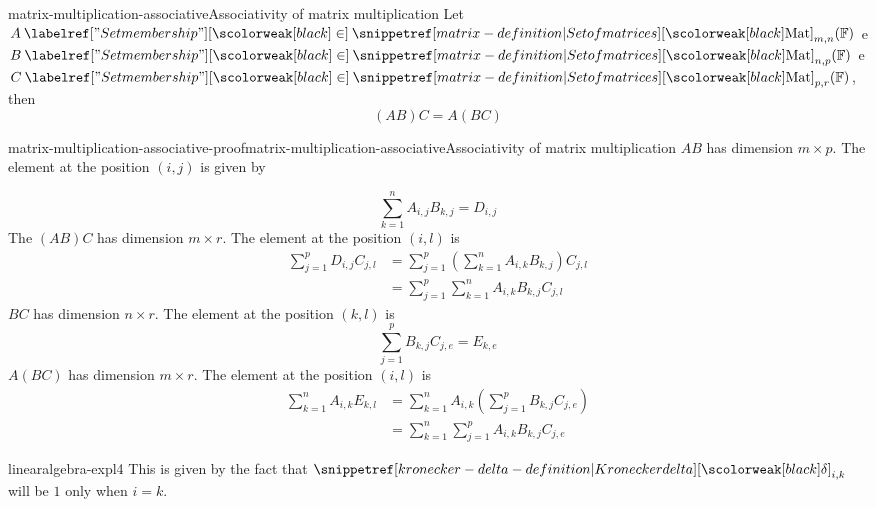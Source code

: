 \documentclass[preview]{standalone}
\begin{document}
\begin{snippetproposition}{matrix-multiplication-associative}{Associativity of matrix multiplication}
    Let \(A \in \matrices_{m,n}(\mathbb{F})\) e \(B \in \matrices_{n,p}(\mathbb{F})\) e \(C \in \matrices_{p,r} (\mathbb{F})\),
    then 
    \[
        (AB)C = A(BC)
    \]
\end{snippetproposition}

\begin{snippetproof}{matrix-multiplication-associative-proof}{matrix-multiplication-associative}{Associativity of matrix multiplication}
    \(AB\) has dimension \(m \times p\). The element at the position \((i,j)\) is given by
    
    \[
        \sum_{k=1}^n A_{i,j}B_{k,j} = D_{i,j}
    \]
    The \matrix \((AB)C\) has dimension \(m \times r\). The element at the position \((i,l)\) is
    \begin{align*}
        \sum_{j=1}^p D_{i,j}C_{j,l} &= \sum_{j=1}^p \left( \sum_{k=1}^n A_{i,k}B_{k,j} \right) C_{j,l} \\
        &= \sum_{j=1}^p \sum_{k=1}^n A_{i,k} B_{k,j} C_{j,l}
    \end{align*}
    \(BC\) has dimension \(n \times r\). The element at the position \((k,l)\) is
    \[
        \sum_{j=1}^p B_{k,j} C_{j,e} = E_{k,e}
    \]
    \(A(BC)\) has dimension \(m \times r\). The element at the position \((i,l)\) is
    \begin{align*}
        \sum_{k=1}^n A_{i,k}E_{k,l} &= \sum_{k=1}^n A_{i,k} \left( \sum_{j=1}^p B_{k,j}C_{j,e} \right)\\
        &= \sum_{k=1}^n \sum_{j=1}^p A_{i,k} B_{k,j} C_{j,e}
    \end{align*}
\end{snippetproof}





\begin{snippet}{linearalgebra-expl4}
This is given by the fact that \(\kronecker_{i,k}\)
will be \(1\) only when \(i = k\).
\end{snippet}

\end{document}
